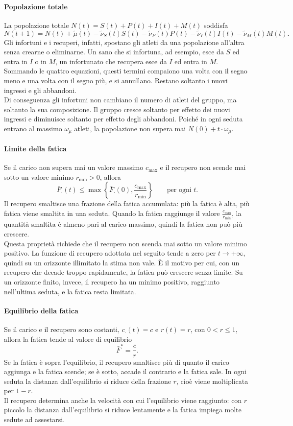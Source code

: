 \paragraph{Popolazione totale}
La popolazione totale $N(t) = S(t) + P(t) + I(t) + M(t)$ soddisfa
\[
    N(t+1) = N(t) + \tilde\mu(t) - \tilde\nu_S(t) S(t) - \tilde\nu_P(t) P(t) - \tilde\nu_I(t) I(t) - \tilde\nu_M(t) M(t).
\]
Gli infortuni e i recuperi, infatti, spostano gli atleti da una popolazione all'altra senza crearne o eliminarne. Un sano che si infortuna, ad esempio, esce da $S$ ed entra in $I$ o in $M$, un infortunato che recupera esce da $I$ ed entra in $M$. Sommando le quattro equazioni, questi termini compaiono una volta con il segno meno e una volta con il segno più, e si annullano. Restano soltanto i nuovi ingressi e gli abbandoni. \\
Di conseguenza gli infortuni non cambiano il numero di atleti del gruppo, ma soltanto la sua composizione. Il gruppo cresce soltanto per effetto dei nuovi ingressi e diminuisce soltanto per effetto degli abbandoni. Poiché in ogni seduta entrano al massimo $\omega_\mu$ atleti, la popolazione non supera mai $N(0) + t \cdot \omega_\mu$.

\paragraph{Limite della fatica}
Se il carico non supera mai un valore massimo $c_{\max}$ e il recupero non scende mai sotto un valore minimo $r_{\min} > 0$, allora
\[
    \bar{F}_\cdot(t) \leq \max\left\{\bar{F}_\cdot(0), \frac{c_{\max}}{r_{\min}}\right\} \qquad \text{per ogni } t.
\]
Il recupero smaltisce una frazione della fatica accumulata: più la fatica è alta, più fatica viene smaltita in una seduta. Quando la fatica raggiunge il valore $\frac{c_{\max}}{r_{\min}}$, la quantità smaltita è almeno pari al carico massimo, quindi la fatica non può più crescere. \\
Questa proprietà richiede che il recupero non scenda mai sotto un valore minimo positivo. La funzione di recupero adottata nel seguito tende a zero per $t \to +\infty$, quindi su un orizzonte illimitato la stima non vale. È il motivo per cui, con un recupero che decade troppo rapidamente, la fatica può crescere senza limite. Su un orizzonte finito, invece, il recupero ha un minimo positivo, raggiunto nell'ultima seduta, e la fatica resta limitata.

\paragraph{Equilibrio della fatica}
Se il carico e il recupero sono costanti, $c_\cdot(t) = c$ e $r(t) = r$, con $0 < r \leq 1$, allora la fatica tende al valore di equilibrio
\[
    \bar{F}^* = \frac{c}{r}.
\]
Se la fatica è sopra l'equilibrio, il recupero smaltisce più di quanto il carico aggiunga e la fatica scende; se è sotto, accade il contrario e la fatica sale. In ogni seduta la distanza dall'equilibrio si riduce della frazione $r$, cioè viene moltiplicata per $1 - r$. \\
Il recupero determina anche la velocità con cui l'equilibrio viene raggiunto: con $r$ piccolo la distanza dall'equilibrio si riduce lentamente e la fatica impiega molte sedute ad assestarsi.

